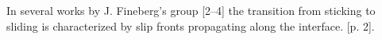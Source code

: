 In several works by J. Fineberg’s group [2–4] the transition from sticking to
sliding is characterized by slip fronts propagating along the interface.
\cite{Manini_2017}[p. 2]. 














